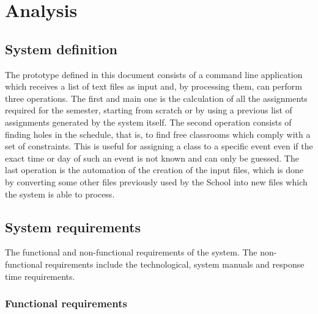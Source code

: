 \renewcommand{\documentname}{Analysis}

\chapter{Analysis}


\section{System definition}

The prototype defined in this document consists of a command line application which receives a list of text files as input and, by processing them, can perform three operations. The first and main one is the calculation of all the assignments required for the semester, starting from scratch or by using a previous list of assignments generated by the system itself. The second operation consists of finding holes in the schedule, that is, to find free classrooms which comply with a set of constraints. This is useful for assigning a class to a specific event even if the exact time or day of such an event is not known and can only be guessed. The last operation is the automation of the creation of the input files, which is done by converting some other files previously used by the School into new files which the system is able to process.



\section{System requirements}

The functional and non-functional requirements of the system. The non-functional requirements include the technological, system manuals and response time requirements.

\subsection{Functional requirements}

